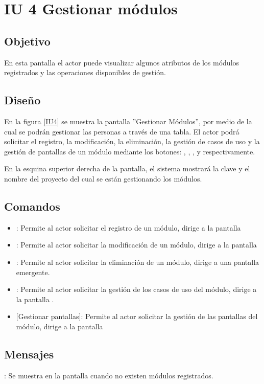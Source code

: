 \section{IU 4 Gestionar módulos}

\subsection{Objetivo}
	En esta pantalla el actor puede visualizar algunos atributos de los módulos registrados y las operaciones disponibles de gestión.
\subsection{Diseño}
	En la figura \ref{IU4} se muestra la pantalla ''Gestionar Módulos'', por medio de la cual se podrán gestionar las personas a través de una tabla. El actor podrá solicitar el registro, la modificación, la eliminación, la gestión de casos de uso y la gestión de pantallas de un módulo mediante los botones: , \editar, \eliminar, {\UCsist } y  respectivamente.
	
	En la esquina superior derecha de la pantalla, el sistema mostrará la clave y el nombre del proyecto del cual se están gestionando los módulos.

\label{IU4}
\subsection{Comandos}
\begin{itemize}
	\item {}: Permite al actor solicitar el registro de un módulo, dirige a la pantalla 
	\item \editar [Modificar]: Permite al actor solicitar la modificación de un módulo, dirige a la pantalla 
	\item \eliminar [Eliminar]: Permite al actor solicitar la eliminación de un módulo, dirige a una pantalla emergente.
	\item {}: Permite al actor solicitar la gestión de los casos de uso del módulo, dirige a la pantalla .
	\item {} [Gestionar pantallas]: Permite al actor solicitar la gestión de las pantallas del módulo, dirige a la pantalla 
\end{itemize}

\subsection{Mensajes}

\begin{Citemize}
	\item {}: Se muestra en la pantalla  cuando no existen módulos registrados.
\end{Citemize}
